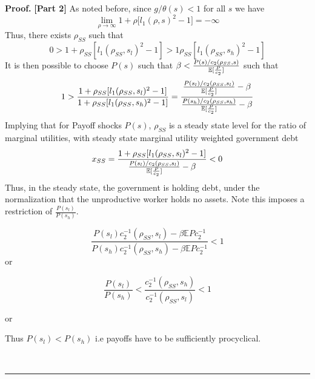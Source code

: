 \documentclass[thmsb,11pt]{article}
\newenvironment{proof}[1][Proof]{\noindent \textbf{#1.} }{\  \rule{0.5em}{0.5em}}
\begin{document}
\begin{proof}
\textbf {[Part 2]} As noted before, since $g/\theta (s)<1$ for all $s$ we have
\begin{equation*}
\lim_{\rho \rightarrow \infty }1+\rho \lbrack l_{1}(\rho ,s)^{2}-1]=-\infty
\end{equation*}%
Thus, there exists $\rho_{SS}$ such that
\begin{equation*}
0>1+\rho_{SS}[l_{1}(\rho_{SS},s_{l})^{2}-1]>1\rho_{SS}[l_{1}(\rho_{SS},s_{h})^{2}-1]
\end{equation*}%
It is then possible to choose $P (s)$ such that $\beta <\frac{P(s)/c_{2}(\rho_{SS},s)}{%
\mathbb{E}[\frac{P}{c_{2}}]}$ such that
\begin{equation}
1>\frac{1+\rho_{SS}[l_{1}(\rho_{SS},s_{l})^{2}-1]}{1+\rho_{SS}[l_{1}(\rho_{SS},s_{h})^{2}-1]}=\frac{\frac{P(s_l)/c_{2}(\rho_{SS},s_{l})%
}{\mathbb{E}[\frac{P}{c_{2}}]}-\beta}{\frac{%
P(s_h)/c_{2}(\rho_{SS},s_{h})}{\mathbb{E}[\frac{P}{c_{2}}]}%
-\beta }  \label{eq.beta_cond}
\end{equation}%
Implying that for Payoff shocks $P(s)$, $\rho_{SS}$ is a
steady state level for the ratio of marginal utilities, with steady state
marginal utility weighted government debt
\begin{equation*}
x_{SS}=\frac{1+\rho_{SS}[l_{1}(\rho_{SS},s_{l})^{2}-1]}{\frac{%
P(s_l)/c_{2}(\rho_{SS},s_{l})}{\mathbb{E}[\frac{P}{c_{2}}]}%
-\beta}<0
\end{equation*}%
Thus, in the steady state, the government is holding debt, under the
normalization that the unproductive worker holds no assets. Note this imposes a restriction of $\frac{P(s_l)}{P(s_h)}$.

\[\frac{P(s_l)c_2^{-1}(\rho_{SS},s_l)-\beta \mathbb{E}Pc_2^{-1}}{P(s_h)c_2^{-1}(\rho_{SS},s_h)-\beta \mathbb{E}Pc_2^{-1}}<1\]
or

\[\frac{P(s_l)}{P(s_h)}<\frac{c_2^{-1}(\rho_{SS},s_h)}{c_2^{-1}(\rho_{SS},s_l)}<1\]

or

Thus $P(s_l)<P(s_h)$ i.e payoffs have to be sufficiently procyclical.

\end{proof}
\end{document}
